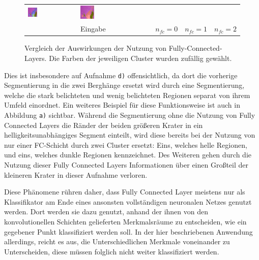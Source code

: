 \begin{figure}[h!]
\begin{tabular}{m{15pt}m{}m{}m{}m{}}
		\includegraphics[width=0.2\textwidth]{images/gen/fully_connected/p03_04.png_1.png} &
		\includegraphics[width=0.2\textwidth]{images/gen/fully_connected/p03_04.png_2.png} \\
		
		&
		\vspace*{2pt}\centering Eingabe & 
		\vspace*{2pt}\centering $n_{fc}=0$ &
		\vspace*{2pt}\centering $n_{fc}=1$ &
		\vspace*{2pt}\centering $n_{fc}=2$ 
	\end{tabular}
	\caption{Vergleich der Auswirkungen der Nutzung von Fully-Connected-Layers. Die Farben der jeweiligen Cluster wurden zufällig gewählt.}
	\label{fig:fc_comparision}
\end{figure}

Dies ist insbesondere auf Aufnahme \texttt{d)} offensichtlich, da dort die vorherige Segmentierung in die zwei Berghänge ersetzt wird durch eine Segmentierung, welche die stark belichteten und wenig belichteten Regionen separat von ihrem Umfeld einordnet. Ein weiteres Beispiel für diese Funktionsweise ist auch in Abbildung \texttt{a)} sichtbar. Während die Segmentierung ohne die Nutzung von Fully Connected Layers die Ränder der beiden größeren Krater in ein helligkeitsunabhängiges Segment einteilt, wird diese bereits bei der Nutzung von nur einer FC-Schicht durch zwei Cluster ersetzt: Eins, welches helle Regionen, und eins, welches dunkle Regionen kennzeichnet. Des Weiteren gehen durch die Nutzung dieser Fully Connected Layers Informationen über einen Großteil der kleineren Krater in dieser Aufnahme verloren.

Diese Phänomene rühren daher, dass Fully Connected Layer meistens nur als Klassifikator am Ende eines ansonsten vollständigen neuronalen Netzes genutzt werden. Dort werden sie dazu genutzt, anhand der ihnen von den konvolutionellen Schichten gelieferten Merkmalsräume zu entscheiden, wie ein gegebener Punkt klassifiziert werden soll. In der hier beschriebenen Anwendung allerdings, reicht es aus, die Unterschiedlichen Merkmale voneinander zu Unterscheiden, diese müssen folglich nicht weiter klassifiziert werden.

